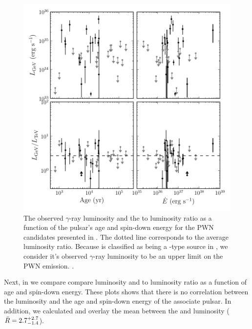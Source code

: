 \begin{figure}[htbp]
  \centering
  \includegraphics{chapters/population_study/figures/pwn_age_edot_vs_l_gev.pdf}
  \caption{The observed $\gamma$-ray luminosity and the \gev
  to \tev luminosity ratio as a function of the pulsar's age
  and spin-down energy for the \ac{PWN} candidates presented in
  .  The dotted line corresponds
  to the average luminosity ratio.  Because  is classified
  as being a \PSRClass-type source in , we consider it's
  observed $\gamma$-ray luminosity to be an upper limit on the \ac{PWN}
  emission.  .}
\end{figure}

Next, in  we compare compare \gev
luminosity and \gev to \tev luminosity ratio as a function of age and
spin-down energy.  These plots shows that there is no correlation between
the \gev luminosity and the age and spin-down energy of the associate
pulsar.  In addition, we calculated and overlay the mean between the
\gev and \tev luminosity ($\bar{R}=2.7_{-1.4}^{+2.7}$).

